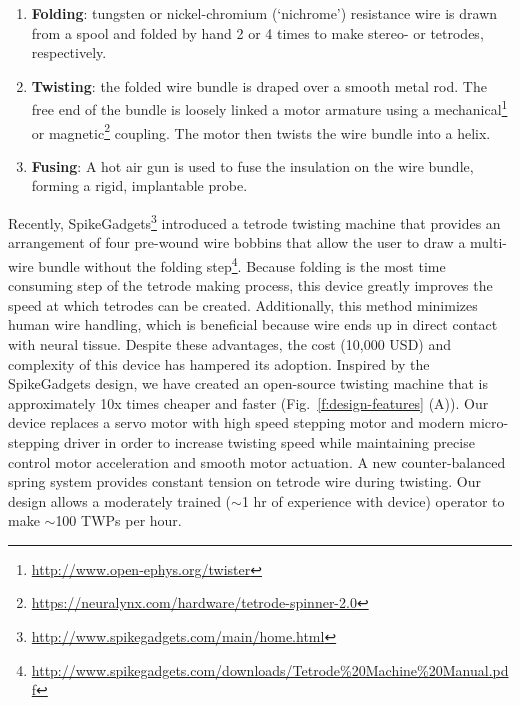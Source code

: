 \documentclass[11pt,a4paper]{article}
\begin{document}
\begin{enumerate}
    \item \textbf{Folding}: tungsten or nickel-chromium (`nichrome')
        resistance wire is drawn from a spool and folded by hand 2 or 4
        times to make stereo- or tetrodes, respectively.
    \item \textbf{Twisting}: the folded wire bundle is draped over a smooth
        metal rod. The free end of the bundle is loosely linked a motor
        armature using a mechanical\footnote{\url{http://www.open-ephys.org/twister}}
        or magnetic\footnote{\url{https://neuralynx.com/hardware/tetrode-spinner-2.0}}
        coupling.  The motor then twists the wire bundle into a helix.
    \item \textbf{Fusing}: A hot air gun is used to fuse the insulation
        on the wire bundle, forming a rigid, implantable probe.
\end{enumerate}


Recently,
SpikeGadgets\footnote{\url{http://www.spikegadgets.com/main/home.html}}
introduced a tetrode twisting machine that provides an arrangement of four
pre-wound wire bobbins that allow the user to draw a multi-wire bundle without
the folding
step\footnote{\url{http://www.spikegadgets.com/downloads/Tetrode\%20Machine\%20Manual.pdf}}.
Because folding is the most time consuming step of the tetrode making process,
this device greatly improves the speed at which tetrodes can be created.
Additionally, this method minimizes human wire handling, which is beneficial
because wire ends up in direct contact with neural tissue. Despite these
advantages, the cost (10,000 USD) and complexity of this device has hampered
its adoption. Inspired by the SpikeGadgets design, we have created an
open-source twisting machine that is approximately 10x times cheaper and faster
(Fig.~\ref{f:design-features} (A)). Our device replaces a servo motor with high
speed stepping motor and modern micro-stepping driver in order to increase
twisting speed while maintaining precise control motor acceleration and smooth
motor actuation. A new counter-balanced spring system provides constant tension
on tetrode wire during twisting. Our design allows a moderately trained
($\sim$1 hr of experience with device) operator to make $\sim$100 TWPs per
hour.
\end{document}
